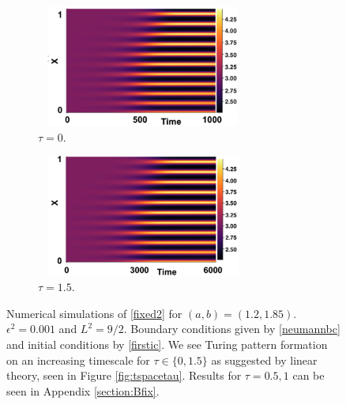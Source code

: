 \begin{figure}[H]
    \centering
    \begin{subfigure}[t]{0.45\textwidth}
        \centering
        \includegraphics[width=7cm,height=4cm]{p2t0.png}
        \caption{$\tau=0$.}
        \label{}
    \end{subfigure}
    \hfill
    \begin{subfigure}[t]{0.45\textwidth}
        \centering
        \includegraphics[width=7cm,height=4cm]{p2t15.png}
        \caption{$\tau=1.5$.}
        \label{}
    \end{subfigure}
    \caption{Numerical simulations of \eqref{fixed2} for $(a,b)=(1.2,1.85)$. $\epsilon^2=0.001$ and $L^2=9/2$. Boundary conditions given by \eqref{neumannbc} and initial conditions by \eqref{firstic}. We see Turing pattern formation on an increasing timescale for $\tau\in\{0,1.5\}$ as suggested by linear theory, seen in Figure \ref{fig:tspacetau}. Results for $\tau=0.5,1$ can be seen in Appendix \ref{section:Bfix}.}
    \label{fig:testturing3}
\end{figure}

